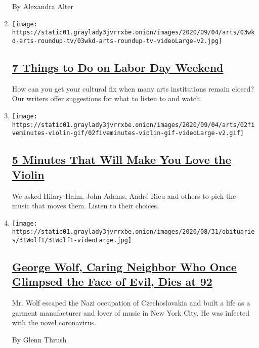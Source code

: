 \begin{enumerate}
  By Alexandra Alter
\item
  \texttt{[image: https://static01.graylady3jvrrxbe.onion/images/2020/09/04/arts/03wkd-arts-roundup-tv/03wkd-arts-roundup-tv-videoLarge-v2.jpg]}

  \hypertarget{7-things-to-do-on-labor-day-weekend}{%
  \subsection{\texorpdfstring{\href{/2020/09/03/arts/things-to-do-weekend-coronavirus.html}{7
  Things to Do on Labor Day
  Weekend}}{7 Things to Do on Labor Day Weekend}}\label{7-things-to-do-on-labor-day-weekend}}

  How can you get your cultural fix when many arts institutions remain
  closed? Our writers offer suggestions for what to listen to and watch.
\item
  \texttt{[image: https://static01.graylady3jvrrxbe.onion/images/2020/09/04/arts/02fiveminutes-violin-gif/02fiveminutes-violin-gif-videoLarge-v2.gif]}

  \hypertarget{5-minutes-that-will-make-you-love-the-violin}{%
  \subsection{\texorpdfstring{\href{/2020/09/02/arts/music/five-minutes-classical-music-violin.html}{5
  Minutes That Will Make You Love the
  Violin}}{5 Minutes That Will Make You Love the Violin}}\label{5-minutes-that-will-make-you-love-the-violin}}

  We asked Hilary Hahn, John Adams, André Rieu and others to pick the
  music that moves them. Listen to their choices.
\item
  \texttt{[image: https://static01.graylady3jvrrxbe.onion/images/2020/08/31/obituaries/31Wolf1/31Wolf1-videoLarge.jpg]}

  \hypertarget{george-wolf-caring-neighbor-who-once-glimpsed-the-face-of-evil-dies-at-92}{%
  \subsection{\texorpdfstring{\href{/2020/09/01/obituaries/george-wolf-dead-coronavirus.html}{George
  Wolf, Caring Neighbor Who Once Glimpsed the Face of Evil, Dies at
  92}}{George Wolf, Caring Neighbor Who Once Glimpsed the Face of Evil, Dies at 92}}\label{george-wolf-caring-neighbor-who-once-glimpsed-the-face-of-evil-dies-at-92}}

  Mr. Wolf escaped the Nazi occupation of Czechoslovakia and built a
  life as a garment manufacturer and lover of music in New York City. He
  was infected with the novel coronavirus.

  By Glenn Thrush
\end{enumerate}


